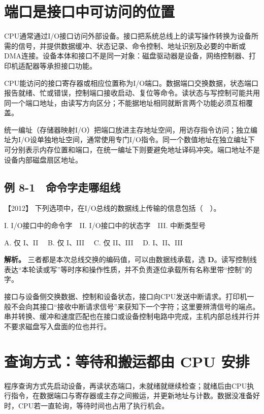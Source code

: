 \section{端口是接口中可访问的位置}\label{co-08-01}

CPU通常通过I/O接口访问外部设备。接口把系统总线上的读写操作转换为设备所需的信号，并提供数据缓冲、状态记录、命令控制、地址识别及必要的中断或DMA连接。设备本体和接口不是同一对象：磁盘驱动器是设备，网络控制器、打印机适配器等承担接口功能。

CPU能访问的接口寄存器或相应位置称为I/O端口。数据端口交换数据，状态端口报告就绪、忙或错误，控制端口接收启动、复位等命令。读状态与写控制可能共用同一个端口地址，由读写方向区分；不能据地址相同就断言两个功能必须互相覆盖。

统一编址（存储器映射I/O）把端口放进主存地址空间，用访存指令访问；独立编址为I/O设单独地址空间，通常使用专门I/O指令。同一个数值地址在独立编址下可分别表示内存位置和端口，在统一编址下则要避免地址译码冲突。端口地址不是设备内部磁盘扇区地址。

\subsection{例 8-1　命令字走哪组线}\label{co-ex8-1}

\noindent{}【2012】 下列选项中，在I/O总线的数据线上传输的信息包括（　）。

I. I/O接口中的命令字　II. I/O接口中的状态字　III. 中断类型号

A. 仅 I、II　 B. 仅 I、III　 C. 仅 II、III　 D. I、II、III


\textbf{解析。} 三者都是本次总线交换的编码值，可以由数据线承载，选 \textbf{D}。读写控制线表达``本轮读或写''等时序和操作性质，并不负责逐位承载所有名称里带``控制''的字。

接口与设备侧交换数据、控制和设备状态，接口向CPU发送中断请求。打印机一般不会向其接口``接收中断请求信号''来获知下一个字符；这里要辨清信号的端点。串并转换、缓冲和速度匹配也在接口或设备控制电路中完成，主机内部总线并行并不要求磁盘写入盘面的位也并行。

\section{查询方式：等待和搬运都由 CPU 安排}\label{co-08-02}

程序查询方式先启动设备，再读状态端口，未就绪就继续检查；就绪后由CPU执行指令，在数据端口与寄存器或主存之间搬运，并更新地址与计数。数据没准备好时，CPU若一直轮询，等待时间也占用了执行机会。

